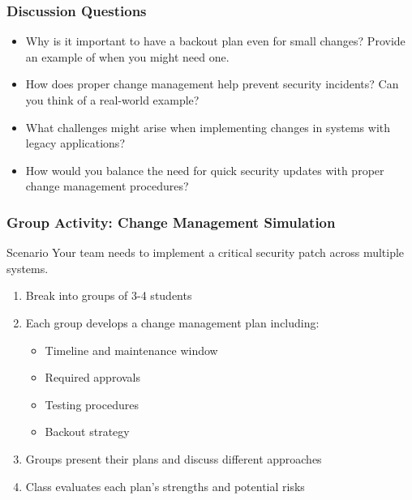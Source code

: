 \documentclass{beamer}
\begin{document}
                        \begin{frame}
                        \frametitle{Discussion Questions}
                        \begin{itemize}
                            \item Why is it important to have a backout plan even for small changes? Provide an example of when you might need one.
                            
                            \item How does proper change management help prevent security incidents? Can you think of a real-world example?
                            
                            \item What challenges might arise when implementing changes in systems with legacy applications?
                            
                            \item How would you balance the need for quick security updates with proper change management procedures?
                        \end{itemize}
                        \end{frame}
                        
                        \begin{frame}
                        \frametitle{Group Activity: Change Management Simulation}
                        \begin{alertblock}{Scenario}
                        Your team needs to implement a critical security patch across multiple systems.
                        \end{alertblock}
                        \begin{enumerate}
                            \item Break into groups of 3-4 students
                            
                            \item Each group develops a change management plan including:
                            \begin{itemize}
                                \item Timeline and maintenance window
                                \item Required approvals
                                \item Testing procedures
                                \item Backout strategy
                            \end{itemize}
                            
                            \item Groups present their plans and discuss different approaches
                            
                            \item Class evaluates each plan's strengths and potential risks
                        \end{enumerate}
                        \end{frame}
                        
                        
\end{document}
